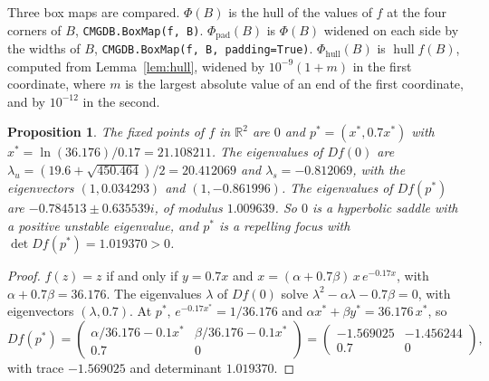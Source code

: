 \documentclass[11pt]{article}
\theoremstyle{plain}
\newtheorem{proposition}{Proposition}[section]
\theoremstyle{definition}
\theoremstyle{remark}
\DeclareMathOperator{\hull}{hull}
\newcommand{\R}{\mathbb{R}}
\newcommand{\Phipad}{\Phi_{\mathrm{pad}}}
\newcommand{\Phihull}{\Phi_{\mathrm{hull}}}
\newcommand{\code}[1]{\texttt{#1}}
\begin{document}
Three box maps are compared. $\Phi(B)$ is the hull of the values of $f$ at the four corners of $B$, \code{CMGDB.BoxMap(f, B)}. $\Phipad(B)$ is $\Phi(B)$ widened on each side by the widths of $B$, \code{CMGDB.BoxMap(f, B, padding=True)}. $\Phihull(B)$ is $\hull f(B)$, computed from Lemma~\ref{lem:hull}, widened by $10^{-9}(1+m)$ in the first coordinate, where $m$ is the largest absolute value of an end of the first coordinate, and by $10^{-12}$ in the second.

\begin{proposition}\label{prop:fixed}
The fixed points of $f$ in $\R^2$ are $0$ and $p^*=(x^*,0.7x^*)$ with $x^*=\ln(36.176)/0.17=21.108211$. The eigenvalues of $Df(0)$ are $\lambda_u=(19.6+\sqrt{450.464})/2=20.412069$ and $\lambda_s=-0.812069$, with the eigenvectors $(1,0.034293)$ and $(1,-0.861996)$. The eigenvalues of $Df(p^*)$ are $-0.784513\pm0.635539i$, of modulus $1.009639$. So $0$ is a hyperbolic saddle with a positive unstable eigenvalue, and $p^*$ is a repelling focus with $\det Df(p^*)=1.019370>0$.
\end{proposition}

\begin{proof}
$f(z)=z$ if and only if $y=0.7x$ and $x=(\alpha+0.7\beta)\,x\,e^{-0.17x}$, with $\alpha+0.7\beta=36.176$. The eigenvalues $\lambda$ of $Df(0)$ solve $\lambda^2-\alpha\lambda-0.7\beta=0$, with eigenvectors $(\lambda,0.7)$. At $p^*$, $e^{-0.17x^*}=1/36.176$ and $\alpha x^*+\beta y^*=36.176\,x^*$, so
\[
Df(p^*)=\begin{pmatrix}\alpha/36.176-0.1x^*&\beta/36.176-0.1x^*\\0.7&0\end{pmatrix}=\begin{pmatrix}-1.569025&-1.456244\\0.7&0\end{pmatrix},
\]
with trace $-1.569025$ and determinant $1.019370$.
\end{proof}
\end{document}
